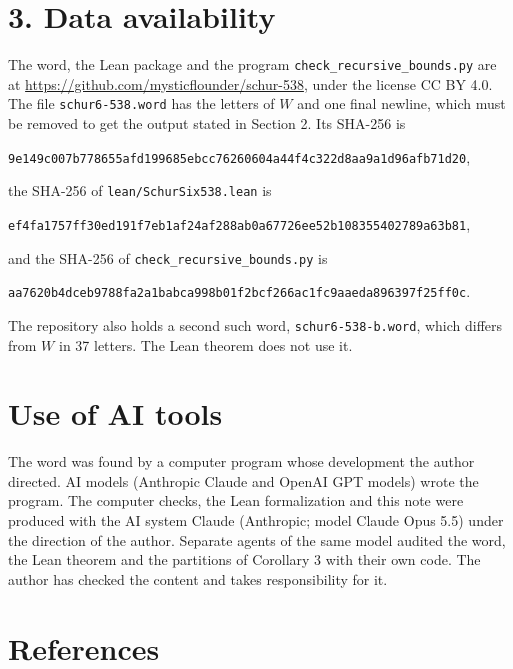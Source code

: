 \documentclass[
]{article}
\begin{document}
\section{3. Data availability}\label{data-availability}

The word, the Lean package and the program
\texttt{check\_recursive\_bounds.py} are at
\url{https://github.com/mysticflounder/schur-538}, under the license CC
BY 4.0. The file \texttt{schur6-538.word} has the letters of \(W\) and
one final newline, which must be removed to get the output stated in
Section 2. Its SHA-256 is

\texttt{9e149c007b778655afd199685ebcc76260604a44f4c322d8aa9a1d96afb71d20},

the SHA-256 of \texttt{lean/SchurSix538.lean} is

\texttt{ef4fa1757ff30ed191f7eb1af24af288ab0a67726ee52b108355402789a63b81},

and the SHA-256 of \texttt{check\_recursive\_bounds.py} is

\texttt{aa7620b4dceb9788fa2a1babca998b01f2bcf266ac1fc9aaeda896397f25ff0c}.

The repository also holds a second such word,
\texttt{schur6-538-b.word}, which differs from \(W\) in 37 letters. The
Lean theorem does not use it.

\section{Use of AI tools}\label{use-of-ai-tools}

The word was found by a computer program whose development the author
directed. AI models (Anthropic Claude and OpenAI GPT models) wrote the
program. The computer checks, the Lean formalization and this note were
produced with the AI system Claude (Anthropic; model Claude Opus 5.5)
under the direction of the author. Separate agents of the same model
audited the word, the Lean theorem and the partitions of Corollary 3
with their own code. The author has checked the content and takes
responsibility for it.

\section{References}\label{references}
\end{document}
